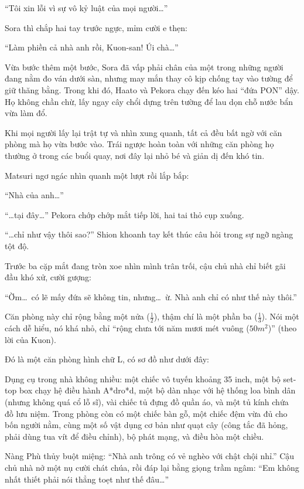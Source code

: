 \documentclass[../main.tex]{subfiles}
\begin{document}
``Tôi xin lỗi vì sự vô kỷ luật của mọi người\dots''

Sora thì chắp hai tay trước ngực, mỉm cười e thẹn:

``Làm phiền cả nhà anh rồi, Kuon-san! Úi chà\dots''

Vừa bước thêm một bước, Sora đã vấp phải chân của một trong những người đang nằm đo ván dưới sàn, nhưng may mắn thay cô kịp chống tay vào tường để giữ thăng bằng. Trong khi đó, Haato và Pekora chạy đến kéo hai ``đứa PON'' dậy. Họ không chần chừ, lấy ngay cây chổi dựng trên tường để lau dọn chỗ nước bẩn vừa làm đổ.

Khi mọi người lấy lại trật tự và nhìn xung quanh, tất cả đều bất ngờ với căn phòng mà họ vừa bước vào. Trái ngược hoàn toàn với những căn phòng họ thường ở trong các buổi quay, nơi đây lại nhỏ bé và giản dị đến khó tin.

Matsuri ngơ ngác nhìn quanh một lượt rồi lắp bắp:

``Nhà của anh\dots''

``\dots tại đây\dots'' Pekora chớp chớp mắt tiếp lời, hai tai thỏ cụp xuống.

``\dots chỉ như vậy thôi sao?'' Shion khoanh tay kết thúc câu hỏi trong sự ngỡ ngàng tột độ.

Trước ba cặp mắt đang tròn xoe nhìn mình trân trối, cậu chủ nhà chỉ biết gãi đầu khó xử, cười gượng:

``Ờm\dots\ có lẽ mấy đứa sẽ không tin, nhưng\dots\ ừ. Nhà anh chỉ có như thế này thôi.''

Căn phòng này chỉ rộng bằng một nửa (\(\frac{1}{2}\)), thậm chí là một phần ba (\(\frac{1}{3}\)). Nói một cách dễ hiểu, nó khá nhỏ, chỉ ``rộng chưa tới năm mươi mét vuông (\(50m^2\))'' (theo lời của Kuon).

Đó là một căn phòng hình chữ L, có sơ đồ như dưới đây:


Dụng cụ trong nhà không nhiều: một chiếc vô tuyến khoảng 35 inch, một bộ set-top box chạy hệ điều hành A*dro*d, một bộ dàn nhạc với hệ thống loa bình dân (nhưng không quá cổ lỗ sĩ), vài chiếc tủ đựng đồ quần áo, và một tủ kính chứa đồ lưu niệm. Trong phòng còn có một chiếc bàn gỗ, một chiếc đệm vừa đủ cho bốn người nằm, cùng một số vật dụng cơ bản như quạt cây (công tắc đã hỏng, phải dùng tua vít để điều chỉnh), bộ phát mạng, và điều hòa một chiều.

Nàng Phù thủy buột miệng: ``Nhà anh trông có vẻ nghèo với chật chội nhỉ.'' Cậu chủ nhà nở một nụ cười chát chúa, rồi đáp lại bằng giọng trầm ngâm: ``Em không nhất thiết phải nói thẳng toẹt như thế đâu\dots''
\end{document}
